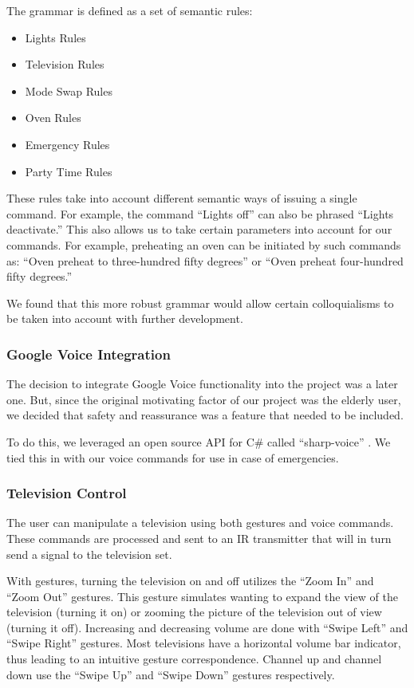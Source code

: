 \documentclass{chi-ext}
\begin{document}
The grammar is defined as a set of semantic rules:
\begin{itemize}\compresslist
\item
Lights Rules
\item
Television Rules
\item
Mode Swap Rules
\item
Oven Rules
\item
Emergency Rules
\item
Party Time Rules
\end{itemize}

These rules take into account different semantic ways of issuing a single command.
For example, the command ``Lights off'' can also be phrased ``Lights deactivate.''
This also allows us to take certain parameters into account for our commands.
For example, preheating an oven can be initiated by such commands as: ``Oven preheat to three-hundred fifty degrees'' or ``Oven preheat four-hundred fifty degrees.''
 
We found that this more robust grammar would allow certain colloquialisms to be taken into account with further development.
 
\subsubsection{Google Voice Integration}
 
The decision to integrate Google Voice functionality into the project was a later one.
But, since the original motivating factor of our project was the elderly user, we decided that safety and reassurance was a feature that needed to be included.
 
To do this, we leveraged an open source API for C\# called ``sharp-voice'' \cite{_sharp_voice}. We tied this in with our voice commands for use in case of emergencies.
 
\subsubsection{Television Control}
The user can manipulate a television using both gestures and voice commands.
These commands are processed and sent to an IR transmitter that will in turn send a signal to the television set.
 
With gestures, turning the television on and off utilizes the ``Zoom In'' and ``Zoom Out'' gestures.
This gesture simulates wanting to expand the view of the television (turning it on) or zooming the picture of the television out of view (turning it off).
Increasing and decreasing volume are done with ``Swipe Left'' and ``Swipe Right'' gestures.
Most televisions have a horizontal volume bar indicator, thus leading to an intuitive gesture correspondence.
Channel up and channel down use the ``Swipe Up'' and ``Swipe Down'' gestures respectively.
 
\end{document}
